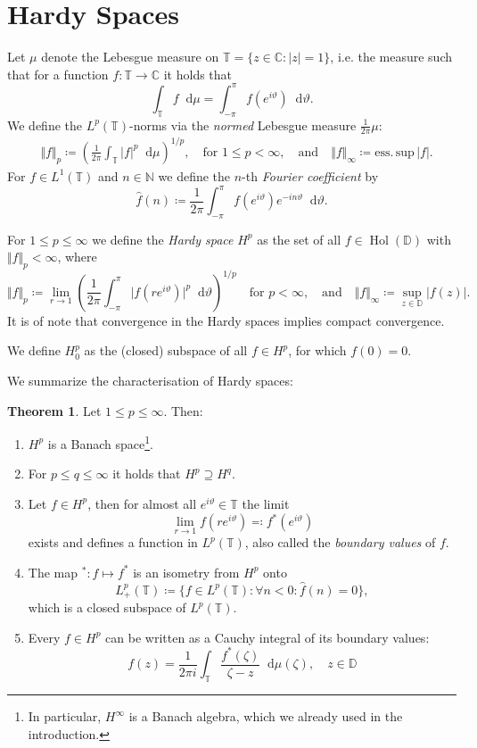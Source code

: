 \documentclass[letterpaper, 11pt]{article}
\newcommand{\C}{\mathbb{C}}
\newcommand{\D}{\mathbb{D}}
\newcommand{\T}{\mathbb{T}}
\newcommand{\N}{\mathbb{N}}
\newcommand{\1}{\mathds{1}}
\newcommand{\diff}{\mathop{}\!\mathrm{d}}
\DeclareMathOperator*{\Hol}{Hol}
\theoremstyle{definition}
\newtheorem{theorem}{Theorem}
\begin{document}
\section{Hardy Spaces}

Let $\mu$ denote the Lebesgue measure on $\T = \{ z \in \C : \vert z \vert = 1 \}$, i.e. the measure such that for a function $f : \T \to \C$ it holds that
$$ \int_\T f \diff \mu = \int_{-\pi}^\pi f(e^{i \vartheta}) \diff \vartheta. $$
We define the $L^p(\T)$-norms via the \emph{normed} Lebesgue measure $\frac{1}{2 \pi} \mu$:
\begin{align*}
  &\Vert f \Vert_p \coloneqq \left( \frac{1}{2\pi} \int_\T \vert f \vert^p \diff \mu \right)^{1/p}, \quad \textrm{for } 1 \leq p < \infty, \quad \textrm{and} \quad \Vert f \Vert_\infty \coloneqq \mathrm{ess.\,sup\,} \vert f \vert.
\end{align*}
For $f \in L^1(\T)$ and $n \in \N$ we define the $n$-th \emph{Fourier coefficient} by
$$ \hat{f}(n) \coloneqq \frac{1}{2\pi} \int_{-\pi}^{\pi} f(e^{i \vartheta}) e^{-i n \vartheta} \diff \vartheta. $$

For $1 \leq p \leq \infty$ we define the \emph{Hardy space} $H^p$ as the set of all $f \in \Hol(\D)$ with $\Vert f \Vert_p < \infty$, where
$$ \Vert f \Vert_p \coloneqq \lim_{r \to 1} \left( \frac{1}{2 \pi} \int_{-\pi}^{\pi} \vert f(r e^{i \vartheta}) \vert^p \diff \vartheta \right)^{1/p} \quad \textrm{for } p < \infty, \quad \textrm{and} \quad \Vert f \Vert_\infty \coloneqq \sup_{z \in \D} \vert f(z) \vert. $$
It is of note that convergence in the Hardy spaces implies compact convergence.

We define $H_0^p$ as the (closed) subspace of all $f \in H^p$, for which $f(0) = 0$.

We summarize the characterisation of Hardy spaces:
\begin{theorem} Let $1 \leq p \leq \infty$. Then:
  \begin{enumerate}
    \item $H^p$ is a Banach space\footnote{In particular, $H^\infty$ is a Banach algebra, which we already used in the introduction.}.
    \item For $p \leq q \leq \infty$ it holds that $H^p \supseteq H^q$.
    \item Let $f \in H^p$, then for almost all $e^{i \vartheta} \in \T$ the limit
    $$ \lim_{r \to 1} f(re^{i \vartheta}) \eqqcolon f^*(e^{i \vartheta}) $$
    exists and defines a function in $L^p(\T)$, also called the \emph{boundary values} of $f$.
    \item The map ${}^* : f \mapsto f^*$ is an isometry from $H^p$ onto
    $$ L^p_+(\T) \coloneqq \{ f \in L^p(\T) : \forall n < 0: \hat{f}(n) = 0 \}, $$
    which is a closed subspace of $L^p(\T)$.
    \item Every $f \in H^p$ can be written as a Cauchy integral of its boundary values:
    $$ f(z) = \frac{1}{2 \pi i} \int_\T \frac{f^*(\zeta)}{\zeta - z} \diff \mu(\zeta), \quad z \in \D $$
  \end{enumerate}
\end{theorem}
\end{document}
